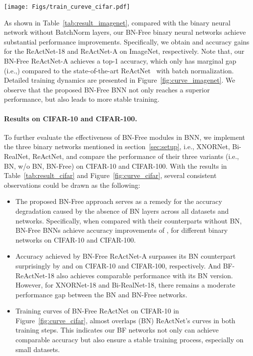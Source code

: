 \documentclass[final]{cvpr}
\begin{document}
\begin{figure*}[!htb]
    \centering
    \texttt{[image: Figs/train\_cureve\_cifar.pdf]}
    \caption{Results of testing accuracy over epochs on CIFAR-10/100 with ReActNet-18/A. The \textcolor{green}{green} background represents the first training step, in which only activations are binarized. And in the \textcolor{orange}{orange} part, both activations and weights are binary.}
    \label{fig:curve_cifar}
\end{figure*}

As shown in Table~\ref{tab:result_imagenet}, compared with the binary neural network without BatchNorm layers, our BN-Free binary neural networks achieve substantial performance improvements. Specifically, we obtain  and  accuracy gains for the ReActNet-18 and ReActNet-A on ImageNet, respectively. Note that, our BN-Free ReActNet-A achieves a  top-1 accuracy, which only has marginal gap (i.e.,) compared to the state-of-the-art ReActNet~\cite{liu2020reactnet} with batch normalization. Detailed training dynamics are presented in Figure~\ref{fig:curve_imagenet}. We observe that the proposed BN-Free BNN not only reaches a superior performance, but also leads to more stable training. 

\paragraph{Results on CIFAR-10 and CIFAR-100.} To further evaluate the effectiveness of BN-Free modules in BNN, we implement the three binary networks mentioned in section~\ref{sec:setup}, i.e., XNORNet, Bi-RealNet, ReActNet, and compare the performance of their three variants (i.e., BN, w/o BN, BN-Free) on CIFAR-10 and CIFAR-100. With the results in Table~\ref{tab:result_cifar} and Figure~\ref{fig:curve_cifar}, several consistent observations could be drawn as the following:
\begin{itemize}
    \item The proposed BN-Free approach serves as a remedy for the accuracy degradation caused by the absence of BN layers across all datasets and networks. Specifically, when compared with their counterparts without BN, BN-Free BNNs achieve accuracy improvements of ,  for different binary networks on CIFAR-10 and CIFAR-100.
    \item Accuracy achieved by BN-Free ReActNet-A surpasses its BN counterpart surprisingly by  and  on CIFAR-10 and CIFAR-100, respectively. And BF-ReActNet-18 also achieves comparable performance with its BN version. However, for XNORNet-18 and Bi-RealNet-18, there remains a moderate performance gap between the BN and BN-Free networks. 
\item Training curves of BN-Free ReActNet on CIFAR-10 in Figure~\ref{fig:curve_cifar}, almost overlaps (BN) ReActNet's curves in both training steps. This indicates our BF networks not only can achieve comparable accuracy but also ensure a stable training process, especially on small datasets.
\end{itemize}
\end{document}
